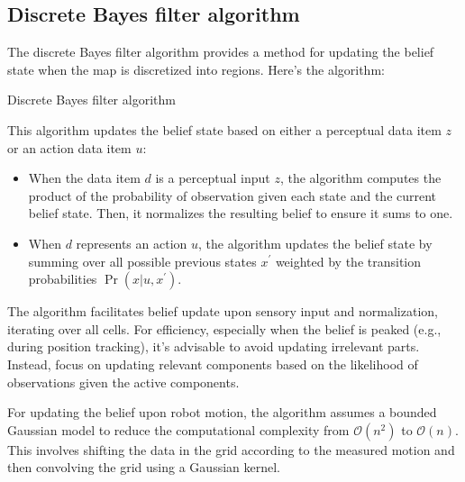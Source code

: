 \subsection{Discrete Bayes filter algorithm}
The discrete Bayes filter algorithm provides a method for updating the belief state when the map is discretized into regions. 
Here's the algorithm:
\begin{algorithm}[H]
    \caption{Discrete Bayes filter algorithm}
        \begin{algorithmic}[1]
                \EndFor
                \EndFor
                \EndFor
            \EndIf
            \State {}
        \end{algorithmic}
\end{algorithm}
This algorithm updates the belief state based on either a perceptual data item $z$ or an action data item $u$: 
\begin{itemize}
    \item When the data item $d$ is a perceptual input $z$, the algorithm computes the product of the probability of observation given each state and the current belief state. 
        Then, it normalizes the resulting belief to ensure it sums to one.
    \item When $d$ represents an action $u$, the algorithm updates the belief state by summing over all possible previous states $x^\prime$ weighted by the transition probabilities $\Pr(x|u,x^\prime)$.
\end{itemize}
The algorithm facilitates belief update upon sensory input and normalization, iterating over all cells. 
For efficiency, especially when the belief is peaked (e.g., during position tracking), it's advisable to avoid updating irrelevant parts. 
Instead, focus on updating relevant components based on the likelihood of observations given the active components.

For updating the belief upon robot motion, the algorithm assumes a bounded Gaussian model to reduce the computational complexity from $\mathcal{O}(n^2)$ to $\mathcal{O}(n)$. 
This involves shifting the data in the grid according to the measured motion and then convolving the grid using a Gaussian kernel.